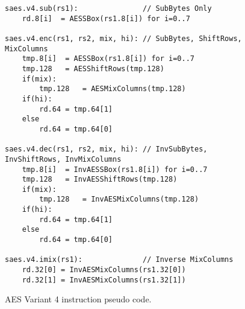 \begin{figure}
\begin{lstlisting}
saes.v4.sub(rs1):               // SubBytes Only
    rd.8[i]  = AESSBox(rs1.8[i]) for i=0..7

saes.v4.enc(rs1, rs2, mix, hi): // SubBytes, ShiftRows, MixColumns
    tmp.8[i]  = AESSBox(rs1.8[i]) for i=0..7
    tmp.128   = AESShiftRows(tmp.128)
    if(mix):
        tmp.128   = AESMixColumns(tmp.128)
    if(hi):
        rd.64 = tmp.64[1]
    else
        rd.64 = tmp.64[0]

saes.v4.dec(rs1, rs2, mix, hi): // InvSubBytes, InvShiftRows, InvMixColumns
    tmp.8[i]  = InvAESSBox(rs1.8[i]) for i=0..7
    tmp.128   = InvAESShiftRows(tmp.128)
    if(mix):
        tmp.128   = InvAESMixColumns(tmp.128)
    if(hi):
        rd.64 = tmp.64[1]
    else
        rd.64 = tmp.64[0]

saes.v4.imix(rs1):              // Inverse MixColumns
    rd.32[0] = InvAESMixColumns(rs1.32[0])
    rd.32[1] = InvAESMixColumns(rs1.32[1])
\end{lstlisting}
\caption{AES Variant 4 instruction pseudo code.}
\label{fig:pesudo:aes:v4}
\end{figure}

